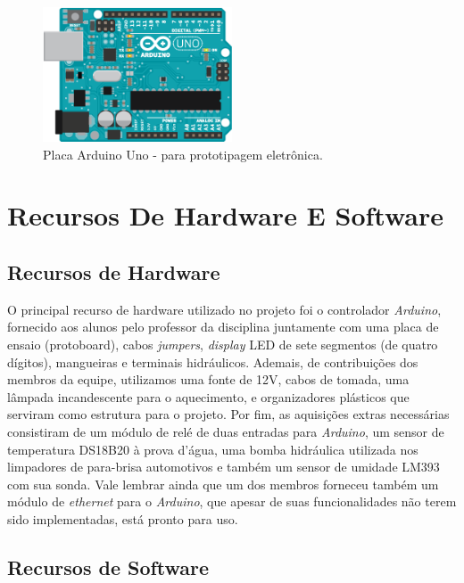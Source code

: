 \documentclass[a4paper,12pt]{article}
\begin{document}
\begin{figure}[!ht]
	\centering
		\includegraphics[width=0.5\textwidth]{illu-arduino-UNO.png}
		\caption{Placa Arduino Uno - para prototipagem eletrônica.}
\end{figure}



\section{Recursos De Hardware E Software}
\subsection{Recursos de Hardware}

O principal recurso de hardware utilizado no projeto foi o controlador \textit{Arduino}, fornecido aos alunos pelo professor da disciplina juntamente com uma placa de ensaio (protoboard), cabos \textit{jumpers}, \textit{display} LED de sete segmentos (de quatro dígitos), mangueiras e terminais hidráulicos. Ademais, de contribuições dos membros da equipe, utilizamos uma fonte de 12V, cabos de tomada, uma lâmpada incandescente para o aquecimento,  e organizadores plásticos que serviram como estrutura para o projeto. Por fim, as aquisições extras necessárias consistiram de um módulo de relé de duas entradas para \textit{Arduino}, um sensor de temperatura DS18B20 à prova d’água, uma bomba hidráulica utilizada nos limpadores de para-brisa automotivos e também um sensor de umidade LM393 com sua sonda. Vale lembrar ainda que um dos membros forneceu também um módulo de \textit{ethernet} para o \textit{Arduino}, que apesar de suas funcionalidades não terem sido implementadas, está pronto para uso.\cite{igoe2007making}




\subsection{Recursos de Software}
\end{document}
